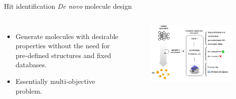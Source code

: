 \documentclass[aspectratio=169,xcolor=dvipsnames]{beamer}
\begin{document}
\begin{frame}{Hit identification \hfill \textit{De novo} molecule design}
    \begin{columns}[c]
        \begin{itemize}
            \item Generate molecules with desirable properties without the need for pre-defined structures and fixed databases.
            \item Essentially multi-objective problem.
        \end{itemize}

        \begin{figure}
            \centering
            \includegraphics[width=.99\linewidth]{imgs/desenho-denovo.png}
        \end{figure}

    \end{columns}
\end{frame}




\end{document}
